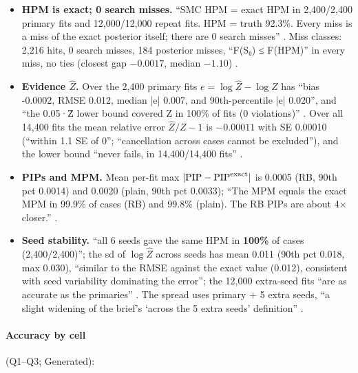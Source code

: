 \begin{itemize}
\item {} \textbf{HPM is exact; 0 search misses.} ``SMC HPM = exact HPM in 2,400/2,400 primary fits and
12,000/12,000 repeat fits. HPM = truth 92.3\%. Every miss is a miss of the exact posterior itself; there are 0 search
misses'' . Miss classes: 2,216 hits, 0 search misses, 184 posterior misses, ``F(S₀) ≤ F(HPM)'' in
every miss, no ties (closest gap $-0.0017$, median $-1.10$) .
\item {} \textbf{Evidence $\hat Z$.} Over the 2,400 primary fits $e=\log\hat Z-\log Z$ has ``bias -0.0002, RMSE 0.012,
median |e| 0.007, and 90th-percentile |e| 0.020'', and ``the 0.05·Ẑ lower bound covered Z in 100\% of fits (0 violations)''
. Over all 14,400 fits the mean relative error
$\hat Z/Z-1$ is $-0.00011$ with SE 0.00010 (``within 1.1 SE of 0''; ``cancellation across cases cannot be excluded''), and the
lower bound ``never fails, in 14,400/14,400 fits'' .
\item {} \textbf{PIPs and MPM.} Mean per-fit max $|\mathrm{PIP}-\mathrm{PIP}^{\rm exact}|$ is 0.0005 (RB, 90th pct
0.0014) and 0.0020 (plain, 90th pct 0.0033); ``The MPM equals the exact MPM in 99.9\% of cases (RB) and 99.8\% (plain). The RB
PIPs are about 4× closer.'' .
\item {} \textbf{Seed stability.} ``all 6 seeds gave the same HPM in \textbf{100\%} of cases (2,400/2,400)''; the sd
of $\log\hat Z$ across seeds has mean 0.011 (90th pct 0.018, max 0.030), ``similar to the RMSE against the exact value
(0.012), consistent with seed variability dominating the error''; the 12,000 extra-seed fits ``are as accurate as the
primaries'' . The spread uses primary $+$ 5 extra seeds,
``a slight widening of the brief's `across the 5 extra seeds' definition'' .
\end{itemize}

\paragraph{Accuracy by cell} (Q1--Q3; Generated):


